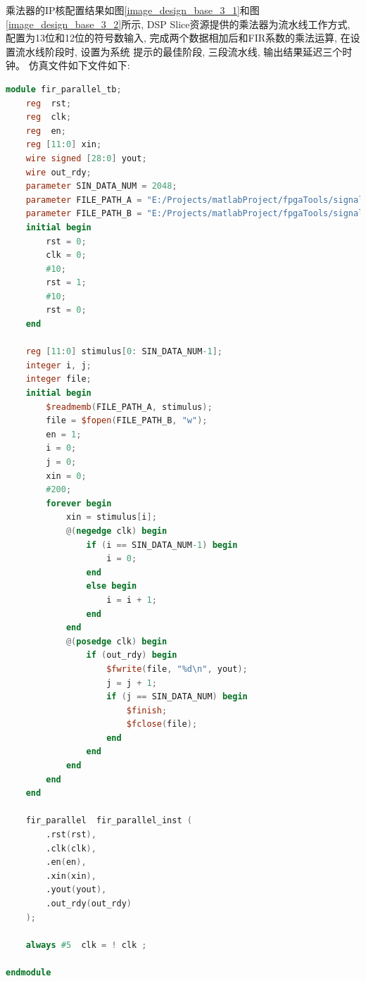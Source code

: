 \documentclass{article}
\begin{document}
乘法器的IP核配置结果如图\ref{image_design_base_3_1}和图\ref{image_design_base_3_2}所示, DSP Slice资源提供的乘法器为流水线工作方式, 
配置为13位和12位的符号数输入, 完成两个数据相加后和FIR系数的乘法运算, 在设置流水线阶段时, 设置为系统
提示的最佳阶段, 三段流水线, 输出结果延迟三个时钟。
仿真文件如下文件如下:
\begin{lstlisting}[language=Verilog, caption={8阶FIR滤波器仿真文件}]
module fir_parallel_tb;
    reg  rst;
    reg  clk;
    reg  en;
    reg [11:0] xin;
    wire signed [28:0] yout;
    wire out_rdy;
    parameter SIN_DATA_NUM = 2048;
    parameter FILE_PATH_A = "E:/Projects/matlabProject/fpgaTools/signal_data.txt";
    parameter FILE_PATH_B = "E:/Projects/matlabProject/fpgaTools/signal_res.txt";   
    initial begin
        rst = 0;
        clk = 0;
        #10;
        rst = 1;
        #10;
        rst = 0;
    end

    reg [11:0] stimulus[0: SIN_DATA_NUM-1];
    integer i, j;
    integer file;
    initial begin
        $readmemb(FILE_PATH_A, stimulus);
        file = $fopen(FILE_PATH_B, "w");
        en = 1;
        i = 0;
        j = 0;
        xin = 0;
        #200;
        forever begin
            xin = stimulus[i];
            @(negedge clk) begin
                if (i == SIN_DATA_NUM-1) begin
                    i = 0;
                end
                else begin
                    i = i + 1;
                end
            end
            @(posedge clk) begin
                if (out_rdy) begin
                    $fwrite(file, "%d\n", yout);
                    j = j + 1;
                    if (j == SIN_DATA_NUM) begin
                        $finish;
                        $fclose(file);
                    end
                end
            end
        end
    end
   
    fir_parallel  fir_parallel_inst (
        .rst(rst),
        .clk(clk),
        .en(en),
        .xin(xin),
        .yout(yout),
        .out_rdy(out_rdy)
    );

    always #5  clk = ! clk ;

endmodule
\end{lstlisting}
\end{document}

